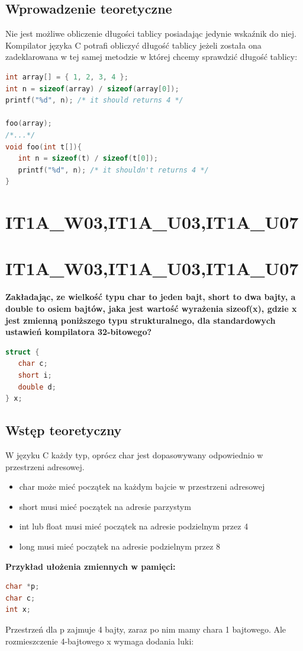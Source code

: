 \subsection{Wprowadzenie teoretyczne}
Nie jest możliwe obliczenie długości tablicy posiadając jedynie wskaźnik do niej.\\
Kompilator języka C potrafi obliczyć długość tablicy jeżeli została ona zadeklarowana w tej samej metodzie w której chcemy sprawdzić długość tablicy:
\begin{lstlisting}[language=c]
int array[] = { 1, 2, 3, 4 };
int n = sizeof(array) / sizeof(array[0]);
printf("%d", n); /* it should returns 4 */

foo(array);
/*...*/
void foo(int t[]){
   int n = sizeof(t) / sizeof(t[0]);
   printf("%d", n); /* it shouldn't returns 4 */
}
\end{lstlisting}


\section{IT1A\_W03,IT1A\_U03,IT1A\_U07}


\section{IT1A\_W03,IT1A\_U03,IT1A\_U07}
\textbf{Zakładając, ze wielkość typu char to jeden bajt, short to dwa bajty, a double to osiem bajtów, jaka jest wartość wyrażenia sizeof(x), gdzie x jest zmienną poniższego typu strukturalnego, dla standardowych ustawień kompilatora 32-bitowego?}
\begin{lstlisting}[language=c]
struct {
   char c;
   short i;
   double d;
} x;
\end{lstlisting}

\subsection{Wstęp teoretyczny}
W języku C każdy typ, oprócz char jest dopasowywany odpowiednio w przestrzeni adresowej.
\begin{itemize}
\item char może mieć początek na każdym bajcie w przestrzeni adresowej
\item short musi mieć początek na adresie parzystym
\item int lub float musi mieć początek na adresie podzielnym przez 4
\item long musi mieć początek na adresie podzielnym przez 8
\end{itemize}
\textbf{Przykład ułożenia zmiennych w pamięci: }
\begin{lstlisting}[language=c]
char *p;
char c;
int x;
\end{lstlisting}
Przestrzeń dla p zajmuje 4 bajty, zaraz po nim mamy chara 1 bajtowego. Ale rozmieszczenie 4-bajtowego x wymaga dodania luki:

